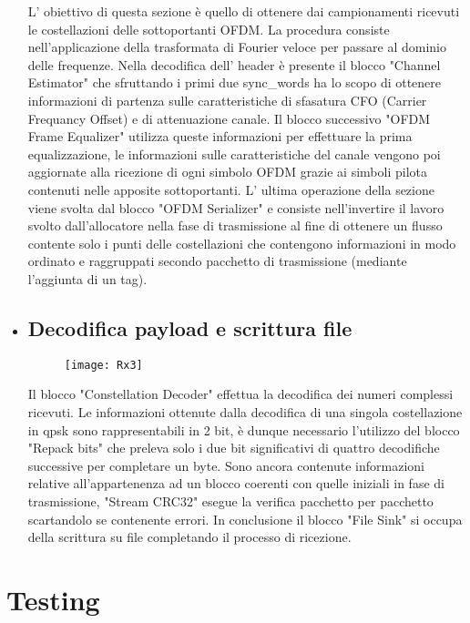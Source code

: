 \begin{itemize}
 	L' obiettivo di questa sezione è quello di ottenere dai campionamenti ricevuti le costellazioni delle sottoportanti OFDM. La procedura consiste nell'applicazione della trasformata di Fourier veloce per passare al dominio delle frequenze. Nella decodifica dell' header è presente il blocco "Channel Estimator" che sfruttando i primi due sync\_words ha lo scopo di ottenere informazioni di partenza sulle caratteristiche di sfasatura CFO (Carrier Frequancy Offset) e di attenuazione canale. Il blocco successivo "OFDM Frame Equalizer" utilizza queste informazioni per effettuare la prima equalizzazione, le informazioni sulle caratteristiche del canale vengono poi aggiornate alla ricezione di ogni simbolo OFDM grazie ai simboli pilota contenuti nelle apposite sottoportanti. L' ultima operazione della sezione viene svolta dal blocco "OFDM Serializer" e consiste nell'invertire il lavoro svolto dall'allocatore nella fase di trasmissione al fine di ottenere un flusso contente solo i punti delle costellazioni che contengono informazioni in modo ordinato e raggruppati secondo pacchetto di trasmissione (mediante l'aggiunta di un tag). 
 	
 	\item \subsection{Decodifica payload e scrittura file}
 	\begin{figure}[h]
 		\raggedleft
 		\texttt{[image: Rx3]}
 		\caption{}
 	\end{figure}
 	Il blocco "Constellation Decoder" effettua la decodifica dei numeri complessi ricevuti. Le informazioni ottenute dalla decodifica di una singola costellazione in qpsk sono rappresentabili in 2 bit, è dunque necessario l'utilizzo del blocco "Repack bits" che preleva solo i due bit significativi di quattro decodifiche successive per completare un byte. Sono ancora contenute informazioni relative all'appartenenza ad un blocco coerenti con quelle iniziali in fase di trasmissione, "Stream CRC32" esegue la verifica pacchetto per pacchetto scartandolo se contenente errori. In conclusione il blocco "File Sink" si occupa della scrittura su file completando il processo di ricezione.
 \end{itemize}
\section{Testing}
